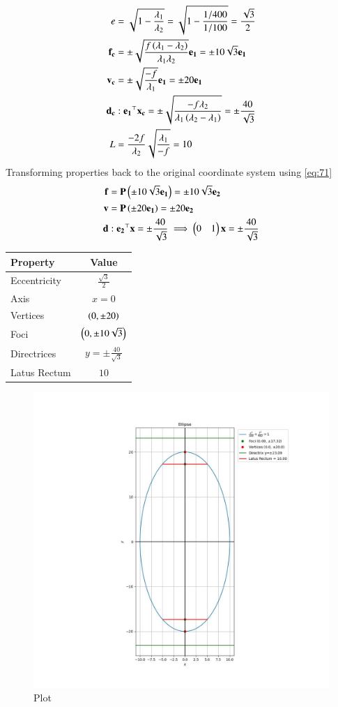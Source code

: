 \documentclass[journal]{IEEEtran}
\begin{document}
\begin{align}
    e &= \sqrt{1 - \frac{\lambda_1}{\lambda_2}} = \sqrt{1 - \frac{1/400}{1/100}} = \frac{\sqrt{3}}{2} \\
    \mathbf{f_c} &= \pm\sqrt{\frac{f\left(\lambda_1 - \lambda_2\right)}{\lambda_1\lambda_2}}\mathbf{e_1} = \pm 10\sqrt{3}\mathbf{e_1} \\
    \mathbf{v_c} &= \pm\sqrt{\frac{-f}{\lambda_1}}\mathbf{e_1} = \pm 20\mathbf{e_1} \\
    \mathbf{d_c} &: \mathbf{e_1}^\top\mathbf{x_c} = \pm\sqrt{\frac{-f\lambda_2}{\lambda_1\left(\lambda_2-\lambda_1\right)}} = \pm\frac{40}{\sqrt{3}} \\
    L &= \frac{-2f}{\lambda_2}\sqrt{\frac{\lambda_1}{-f}} = 10
\end{align}
Transforming properties back to the original coordinate system using \eqref{eq:71}
\begin{align}
    \mathbf{f} &= \mathbf{P}\left(\pm 10\sqrt{3}\mathbf{e_1}\right) = \pm 10\sqrt{3}\mathbf{e_2} \\
    \mathbf{v} &= \mathbf{P}\left(\pm 20\mathbf{e_1}\right) = \pm 20\mathbf{e_2} \\
    \mathbf{d} &: \mathbf{e_2}^\top\mathbf{x} = \pm \frac{40}{\sqrt{3}} \implies \begin{pmatrix}0 & 1\end{pmatrix}\mathbf{x} = \pm \frac{40}{\sqrt{3}}
\end{align}
\begin{center}
\begin{tabular}{|l|c|}
    \hline
    \textbf{Property} & \textbf{Value} \\
    \hline
    Eccentricity & $\frac{\sqrt{3}}{2}$ \\
    \hline
    Axis & $x=0$ \\
    \hline
    Vertices & $\left(0, \pm 20\right)$ \\
    \hline
    Foci & $\left(0, \pm 10\sqrt{3}\right)$ \\
    \hline
    Directrices & $y = \pm \frac{40}{\sqrt{3}}$ \\
    \hline
    Latus Rectum & $10$ \\
    \hline
\end{tabular}
\end{center}

\begin{figure}[h!]
	\centering
	\includegraphics[width=0.9\columnwidth]{figs/plot_c.jpg}
	\caption*{Plot}
	\label{fig:fig}
\end{figure}
\end{document}

